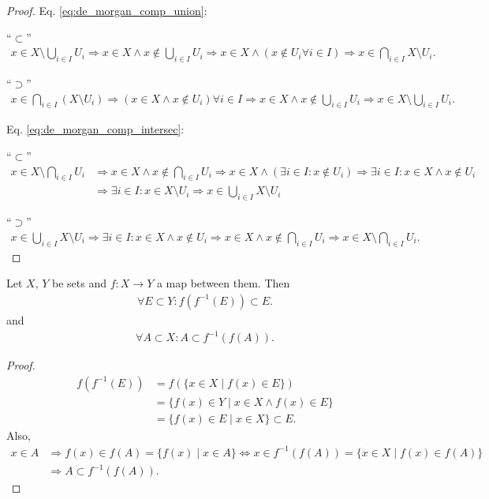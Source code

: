 \begin{proof}
	Eq. \eqref{eq:de_morgan_comp_union}: 
	
	\enquote{$\subset$} 
	\begin{align*}
		x\in X\setminus\bigcup_{i\in I}U_i\Rightarrow x\in X \wedge x\notin \bigcup_{i\in I}U_i\Rightarrow x\in X \wedge (x\notin U_i\forall i\in I)\Rightarrow x\in \bigcap_{i\in I}X\setminus U_i.
	\end{align*}

	\enquote{$\supset$}
	\begin{align*}
		x\in \bigcap_{i\in I}\left(X\setminus U_i\right) \Rightarrow \left(x\in X \wedge x\notin U_i\right) \forall i\in I\Rightarrow x\in X\wedge x\notin \bigcup_{i\in I}U_i\Rightarrow x\in X\setminus \bigcup_{i\in I}U_i.
	\end{align*}

	\noindent Eq. \eqref{eq:de_morgan_comp_intersec}:
	
	\enquote{$\subset$} 
	\begin{align*}
		x\in X\setminus \bigcap_{i\in I}U_i &\Rightarrow x\in X \wedge x\notin \bigcap_{i\in I}U_i \Rightarrow x\in X \wedge (\exists i\in I: x\notin U_i)\Rightarrow \exists i\in I: x\in X \wedge x\notin U_i \\ &\Rightarrow \exists i\in I: x\in X\setminus U_i\Rightarrow x\in \bigcup_{i\in I}X\setminus U_i
	\end{align*}

	\enquote{$\supset$}
	\begin{align*}
		x\in \bigcup_{i\in I}X\setminus U_i\Rightarrow \exists i\in I: x\in X\wedge x\notin U_i\Rightarrow x\in X\wedge x\notin \bigcap_{i\in I}U_i\Rightarrow x\in X\setminus \bigcap_{i\in I}U_i.
	\end{align*}
\end{proof}

\begin{theorem}
	Let $X$, $Y$ be sets and $f: X\to Y$ a map between them. Then 
	\begin{align}\label{eq:image_preimage_of_set}
		\forall E\subset Y: f(f^{-1}(E))\subset E.
	\end{align}
	and 
	\begin{align}\label{eq:preimage_image_of_set}
		\forall A\subset X: A\subset f^{-1}(f(A)).
	\end{align}
\end{theorem}

\begin{proof}
	\begin{align*}
		f(f^{-1}(E)) &= f(\{x\in X\mid f(x)\in E\}) \\ &= \{f(x)\in Y\mid x\in X\wedge f(x)\in E\} \\ &= \{ f(x)\in E\mid x\in X \}\subset E.
	\end{align*}
	Also, 
	\begin{align*}
		x\in A&\Rightarrow f(x)\in f(A) = \{f(x)\mid x\in A\}\Leftrightarrow x\in f^{-1}(f(A)) = \{x\in X\mid f(x)\in f(A)\}
		\\ &\Rightarrow A\subset f^{-1}(f(A)).
	\end{align*}
\end{proof}

